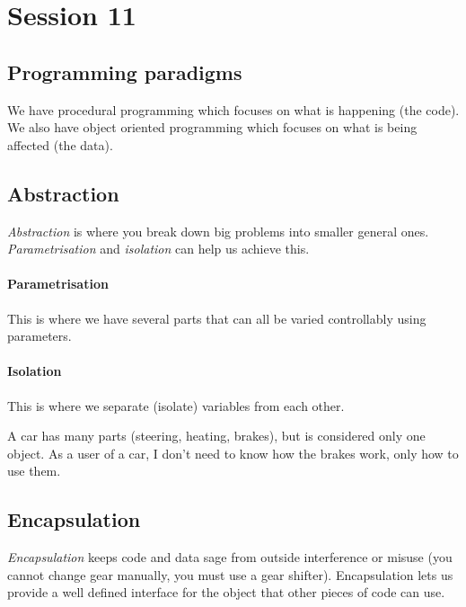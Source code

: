 \section{Session 11}\label{sec:session_11}

\subsection{Programming paradigms}\label{sub:programming_paradigms}

We have procedural programming which focuses on what is happening (the code).
We also have object oriented programming which focuses on what is being affected (the data).

\subsection{Abstraction}\label{sub:abstraction}

\emph{Abstraction} is where you break down big problems into smaller general ones.
\emph{Parametrisation} and \emph{isolation} can help us achieve this.

\paragraph{Parametrisation}\label{par:parametrisation}

This is where we have several parts that can all be varied controllably using parameters.

\paragraph{Isolation}\label{par:isolation}

This is where we separate (isolate) variables from each other.

\medskip
\noindent
A car has many parts (steering, heating, brakes), but is considered only one object.
As a user of a car, I don't need to know how the brakes work, only how to use them.

\subsection{Encapsulation}\label{sub:encapsulation}

\emph{Encapsulation} keeps code and data sage from outside interference or misuse (you cannot change gear manually, you must use a gear shifter).
Encapsulation lets us provide a well defined interface for the object that other pieces of code can use.

